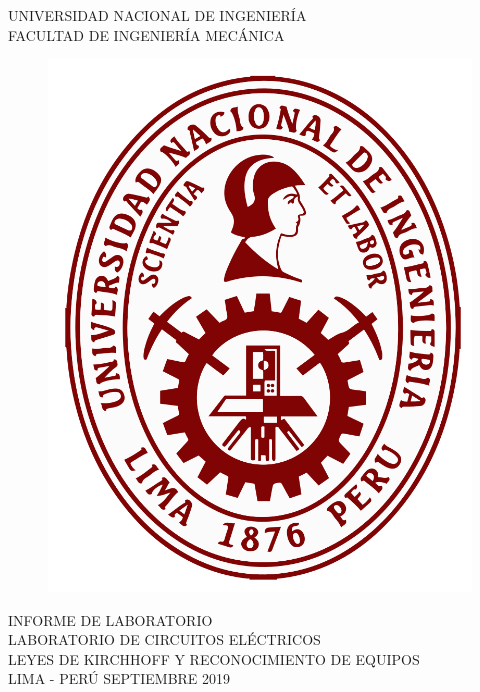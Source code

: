 \documentclass[a4paper,12pt]{report}
\begin{document}
\setcounter{page}{1}
\thispagestyle{empty}
\begin{center}
{\huge UNIVERSIDAD NACIONAL DE INGENIERÍA}\\[0.9cm]
{\Large FACULTAD DE INGENIERÍA MECÁNICA}\\[0.6in]
\end{center}
\begin{figure}[h]
\begin{center}
\includegraphics[scale=0.33]{logoUNI.png}
\vspace{0cm}
\end{center}
\end{figure}
\vspace{0.5cm}
\begin{center}
INFORME DE LABORATORIO\\
LABORATORIO DE CIRCUITOS ELÉCTRICOS\\[5mm]
{\large LEYES DE KIRCHHOFF Y RECONOCIMIENTO DE EQUIPOS}\\[10mm]
\vfill
LIMA - PERÚ \hfill SEPTIEMBRE 2019
\end{center}
\end{document}
